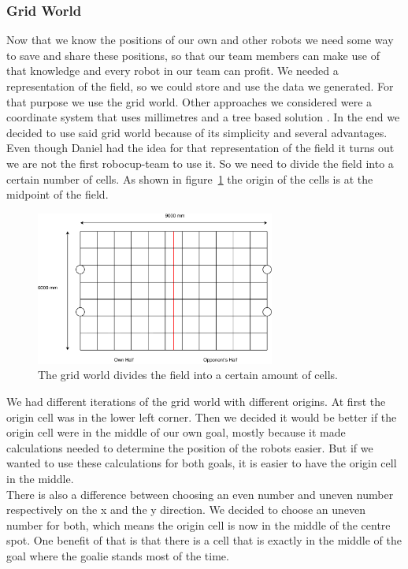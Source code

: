 \documentclass[lnicst,a4paper]{svmultln}
\begin{document}

\subsubsection{Grid World}
Now that we know the positions of our own and other robots we need some way to save and share these positions, so that our team members can make use of that knowledge and every robot in our team can profit. We needed a representation of the field, so we could store and use the data we generated. For that purpose we use the grid world. Other approaches we considered were a coordinate system that uses millimetres and a tree based solution \cite{tree}. In the end we decided to use said grid world because of its simplicity and several advantages. Even though Daniel had the idea for that representation of the field it turns out we are not the first robocup-team to use it. \cite{grid} So we need to divide the field into a certain number of cells. As shown in figure~\ref{fig:gridworld} the origin of the cells is at the midpoint of the field.
\begin{figure}
 	\centerline{\includegraphics[width=0.7\textwidth]{gridworld.pdf}}
	{\caption{The grid world divides the field into a certain amount of cells.}\label{fig:gridworld}}
\end{figure}
We had different iterations of the grid world with different origins. At first the origin cell was in the lower left corner. Then we decided it would be better if the origin cell were in the middle of our own goal, mostly because it made calculations needed to determine the position of the robots easier. But if we wanted to use these calculations for both goals, it is easier to have the origin cell in the middle. 
\\
There is also a difference between choosing an even number and uneven number respectively on the x and the y direction. We decided to choose an uneven number for both, which means the origin cell is now in the middle of the centre spot. One benefit of that is that there is a cell that is exactly in the middle of the goal where the goalie stands most of the time. 
\end{document}
